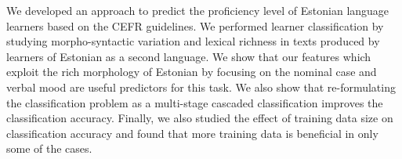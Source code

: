 We developed an approach to predict the proficiency level of Estonian language learners based on the CEFR guidelines. We performed learner classification by
 studying morpho-syntactic variation and lexical richness in texts produced by
 learners of Estonian as a second language. We show that our features which
 exploit the rich morphology of Estonian by focusing on the nominal case and
 verbal mood are useful predictors for this task. We also show that
 re-formulating the classification problem as a multi-stage cascaded
 classification improves the classification accuracy. Finally, we also studied
 the effect of training data size on classification accuracy and found that more
 training data is beneficial in only some of the cases.

